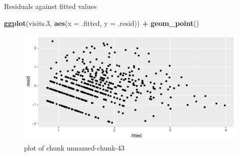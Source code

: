 \documentclass[ignorenonframetext,]{beamer}
\newenvironment{Shaded}{\begin{snugshade}}{\end{snugshade}}
\newcommand{\DataTypeTok}[1]{\textcolor[rgb]{0.13,0.29,0.53}{#1}}
\newcommand{\FloatTok}[1]{\textcolor[rgb]{0.00,0.00,0.81}{#1}}
\newcommand{\KeywordTok}[1]{\textcolor[rgb]{0.13,0.29,0.53}{\textbf{#1}}}
\newcommand{\NormalTok}[1]{#1}
\newcommand{\OperatorTok}[1]{\textcolor[rgb]{0.81,0.36,0.00}{\textbf{#1}}}
\newcommand{\StringTok}[1]{\textcolor[rgb]{0.31,0.60,0.02}{#1}}
\begin{document}
\begin{frame}[fragile]{Residuals against fitted values}
\protect\hypertarget{residuals-against-fitted-values}{}

\begin{Shaded}
\begin{Highlighting}[]
\KeywordTok{ggplot}\NormalTok{(visits}\FloatTok{.3}\NormalTok{, }\KeywordTok{aes}\NormalTok{(}\DataTypeTok{x =}\NormalTok{ .fitted, }\DataTypeTok{y =}\NormalTok{ .resid)) }\OperatorTok{+}
\StringTok{  }\KeywordTok{geom_point}\NormalTok{()}
\end{Highlighting}
\end{Shaded}

\begin{figure}
\centering
\includegraphics{figure/unnamed-chunk-43-1.pdf}
\caption{plot of chunk unnamed-chunk-43}
\end{figure}

\end{frame}
\end{document}
